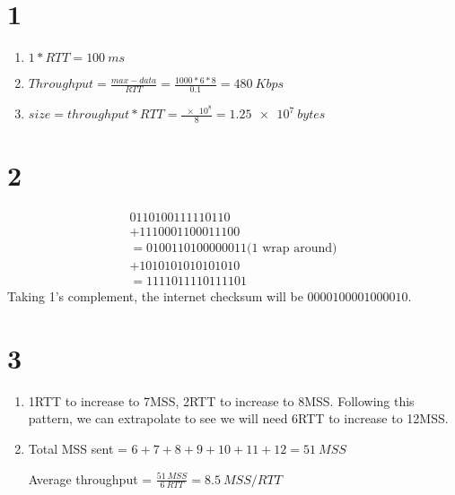 \section*{1}
\begin{enumerate}
  \item $1*RTT =\SI{100}{ms}$
  \item $Throughput = \frac{max-data}{RTT} = \frac{1000 * 6 * 8}{0.1} = \SI{480}{Kbps}$
  \item $size = throughput * RTT = \frac{\num{e8}}{8} = \SI{1.25e7}{bytes}$
\end{enumerate}

\section*{2}
\begin{equation*}
\begin{split}
  01101001 11110110\\
 +11100011 00011100\\
 =0100110100000011 \text{(1 wrap around)}\\
 +10101010 10101010\\
 =1111011110111101
\end{split}
\end{equation*}
Taking 1's complement, the internet checksum will be $0000100001000010$.

\section*{3}
\begin{enumerate}[label=\alph*.]
    \item 1RTT to increase to 7MSS, 2RTT to increase to 8MSS. Following this pattern, we can extrapolate to see we will need 6RTT to increase to 12MSS.
    \item Total MSS sent = $6 + 7 + 8 + 9 + 10 + 11 + 12 = \SI{51}{MSS}$
    
    Average throughput = $\frac{\SI{51}{MSS}}{\SI{6}{RTT}} = \SI{8.5}{MSS/RTT}$
\end{enumerate}

